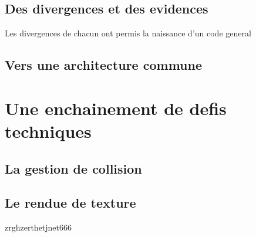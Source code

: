 \documentclass[french,12pt]{article}
\begin{document}
\subsection{Des divergences et des evidences}
Les divergences de chacun ont permis la naissance d'un code general

\subsection{Vers une architecture commune}

\section{Une enchainement de defis techniques}
\subsection{La gestion de collision}

\subsection{Le rendue de texture}

zrghzerthetjnet666
\end{document}
